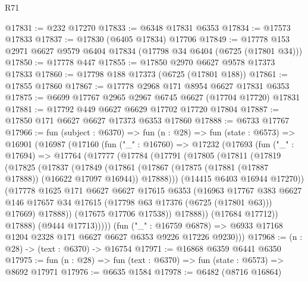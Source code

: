 \begin{lexlean}{R71}
\begin{coremodule}
@17831 := @232 @17270
@17833 := @6348 @17831 @6353
@17834 := @17573 @17833
@17837 := @17830 (@6405 @17834) @17706
@17849 := @17778 @153 @2971 @6627 @9579 @6404 @17834 (@17798 @34 @6404 (@6725 (@17801 @34)))
@17850 := @17778 @447
@17855 := @17850 @2970 @6627 @9578 @17373 @17833
@17860 := @17798 @188 @17373 (@6725 (@17801 @188))
@17861 := @17855 @17860
@17867 := @17778 @2968 @171 @8954 @6627 @17831 @6353
@17875 := @6699 @17767 @2965 @2967 @6745 @6627 (@17704 @17720) @17831
@17881 := @17792 @449 @6627 @6629 @17702 @17720 @17804
@17887 := @17850 @171 @6627 @6627 @17373 @6353 @17860
@17888 := @6733 @17767
@17966 := fun (subject : @6370) =>
  fun (n : @28) =>
  fun (state : @6573) =>
  @16901
    (@16987
      (@17160
        (fun ("_" : @16760) =>
        @17232
          (@17693
            (fun ("_" : @17694) =>
            @17764
              (@17777
                (@17784
                  (@17791
                    (@17805
                      (@17811
                        (@17819
                          (@17825
                            (@17837
                              (@17849
                                (@17861
                                  (@17867
                                    (@17875 (@17881 (@17887 @17888)) (@16622 @17097 @16944))
                                    @17888)))
                              (@14415 @6403 @16944 @17270))
                            (@17778
                              @1625
                              @171
                              @6627
                              @6627
                              @17615
                              @6353
                              (@16963
                                @17767
                                @383
                                @6627
                                @146
                                @17657
                                @34
                                @17615
                                (@17798 @63 @17376 (@6725 (@17801 @63)))
                                @17669)
                              @17888))
                          (@17675 @17706 @17538))
                        @17888))
                    (@17684 @17712))
                  @17888)
                (@9444 @17713)))))
        (fun ("_" : @16759 @6878) =>
        @6933 @17168 @1204 @2328 @171 @6627 @6627 @6353 @9226 @17226 @9230)))
@17968 := (n : @28) -> (text : @6370) -> @16754
@17971 := @16868 @6359 @6441 @6350
@17975 := fun (n : @28) => fun (text : @6370) => fun (state : @6573) => @8692 @17971
@17976 := @6635 @1584
@17978 := @6482 (@8716 @16864)

\end{coremodule}
\end{lexlean}

